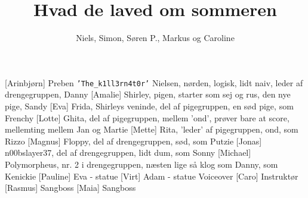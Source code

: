 \documentclass[a4paper,11pt]{article}
\title{Hvad de laved om sommeren}
\author{Niels, Simon, Søren P., Markus og Caroline}
\begin{document}
\maketitle

\begin{roles}
  [Arinbjørn] Preben \texttt{'The\_k1ll3rn4t0r'} Nielsen, nørden, logisk, lidt naiv, leder af drengegruppen, Danny
  [Amalie] Shirley, pigen, starter som sej og rus, den nye pige, Sandy
  [Eva] Frida, Shirleys veninde, del af pigegruppen, en sød pige, som Frenchy
  [Lotte] Ghita, del af pigegruppen, mellem 'ond', prøver bare at score, mellemting mellem Jan og Martie
  [Mette] Rita, 'leder' af pigegruppen, ond, som Rizzo
  [Magnus] Floppy, del af drengegruppen, sød, som Putzie
  [Jonas] n00bslayer37, del af drengegruppen, lidt dum, som Sonny
  [Michael] Polymorpheus, nr. 2 i drengegruppen, næsten lige så klog som Danny, som Kenickie
  [Pauline] Eva - statue
  [Virt] Adam - statue
   Voiceover
  [Caro] Instruktør
  [Rasmus] Sangboss
  [Maia] Sangboss
\end{roles}
\begin{props}
\end{props}
\end{document}
